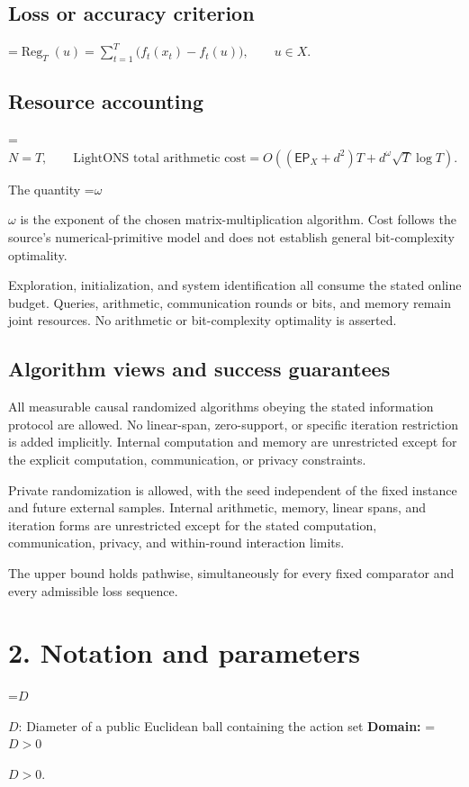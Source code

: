 \documentclass[10pt,a4paper]{article}
\newcommand{\AtlasMath}[1]{\par\begingroup\centering\setbox0=\hbox{$\displaystyle #1$}\ifdim\wd0>1.4\linewidth\typeout{ATLAS WIDE FORMULA: \the\wd0}\fi\ifdim\wd0>\linewidth\resizebox{\linewidth}{!}{\box0}\else\box0\fi\par\endgroup}
\newcommand{\AtlasInlineMath}[1]{\begingroup\setbox0=\hbox{$#1$}\ifdim\wd0>.4\linewidth\endgroup\AtlasMath{#1}\else\endgroup$#1$\fi}
\begin{document}
\subsection{Loss or accuracy criterion}

\AtlasMath{\operatorname{Reg}_T(u)=\sum_{t=1}^{T}\bigl(f_t(x_t)-f_t(u)\bigr),\qquad u\in X.}


\subsection{Resource accounting}

\AtlasMath{N=T,\qquad \text{LightONS total arithmetic cost}=O\!\left((\mathsf{EP}_X+d^2)T+d^{\omega}\sqrt T\log T\right).}


The quantity \AtlasInlineMath{\omega} is the exponent of the chosen matrix-multiplication algorithm. Cost follows the source's numerical-primitive model and does not establish general bit-complexity optimality.

Exploration, initialization, and system identification all consume the stated online budget. Queries, arithmetic, communication rounds or bits, and memory remain joint resources. No arithmetic or bit-complexity optimality is asserted.

\subsection{Algorithm views and success guarantees}
All measurable causal randomized algorithms obeying the stated information protocol are allowed. No linear-span, zero-support, or specific iteration restriction is added implicitly. Internal computation and memory are unrestricted except for the explicit computation, communication, or privacy constraints.

Private randomization is allowed, with the seed independent of the fixed instance and future external samples. Internal arithmetic, memory, linear spans, and iteration forms are unrestricted except for the stated computation, communication, privacy, and within-round interaction limits.

The upper bound holds pathwise, simultaneously for every fixed comparator and every admissible loss sequence.

\section{2. Notation and parameters}
\AtlasInlineMath{D}: Diameter of a public Euclidean ball containing the action set \textbf{Domain:} \AtlasInlineMath{D>0}.
\end{document}
